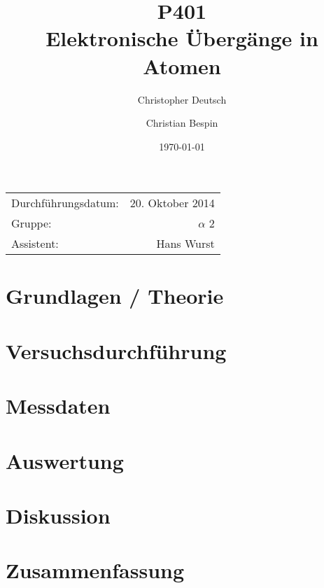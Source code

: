 \documentclass[10pt, a4paper]{article}
\title{P401 \\ Elektronische Übergänge in Atomen}
\author{Christopher Deutsch \and Christian Bespin}
\date{\today}
\begin{document}
\maketitle

\begin{center}
\begin{tabular}{l r}
Durchführungsdatum: & 20. Oktober 2014 \\
Gruppe: & $\alpha$ 2 \\
Assistent: & Hans Wurst
\end{tabular}
\end{center}


\begin{abstract}
\end{abstract}

\section{Grundlagen / Theorie}

\section{Versuchsdurchführung}

\section{Messdaten}

\section{Auswertung}

\section{Diskussion}

\section{Zusammenfassung}

\end{document}
